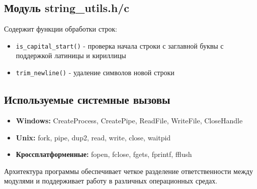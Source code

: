 \subsection{Модуль string\_utils.h/c}
Содержит функции обработки строк:
\begin{itemize}
    \item \texttt{is\_capital\_start()} - проверка начала строки с заглавной буквы с поддержкой латиницы и кириллицы
    \item \texttt{trim\_newline()} - удаление символов новой строки
\end{itemize}

\subsection{Используемые системные вызовы}
\begin{itemize}
    \item \textbf{Windows:} CreateProcess, CreatePipe, ReadFile, WriteFile, CloseHandle
    \item \textbf{Unix:} fork, pipe, dup2, read, write, close, waitpid
    \item \textbf{Кроссплатформенные:} fopen, fclose, fgets, fprintf, fflush
\end{itemize}

Архитектура программы обеспечивает четкое разделение ответственности между модулями и поддерживает работу в различных операционных средах.